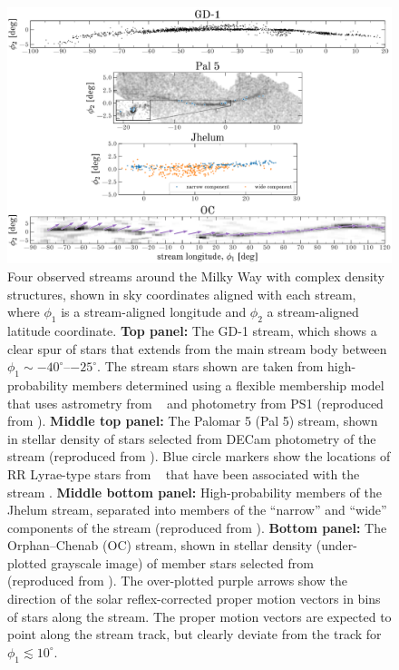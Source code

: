 \documentclass[final,5p,times,twocolumn,authoryear]{elsarticle}
\begin{document}
\begin{figure}[t!]
    \centering
    \includegraphics[width=\textwidth]{figures/stream-density-structure.pdf}
    \caption{
        Four observed streams around the Milky Way with complex density structures,
        shown in sky coordinates aligned with each stream, where $\phi_1$ is a
        stream-aligned longitude and $\phi_2$ a stream-aligned latitude coordinate.
        \textbf{Top panel:} The GD-1 stream, which shows a clear spur of stars that
        extends from the main stream body between $\phi_1 \sim -40^\circ$--$-25^\circ$.
        The stream stars shown are taken from high-probability members determined using
        a flexible membership model that uses astrometry from \gaia\  and
        photometry from PS1 (reproduced from \citealt{tavangar:2024}).
        \textbf{Middle top panel:} The Palomar 5 (Pal 5) stream, shown in stellar
        density of stars selected from DECam photometry of the stream (reproduced from
        \citealt{bonaca:2019}).
        Blue circle markers show the locations of RR Lyrae-type stars from \gaia\ 
        that have been associated with the stream \citep{price-whelan:2019}.
        \textbf{Middle bottom panel:} High-probability members of the Jhelum stream,
        separated into members of the ``narrow'' and ``wide'' components of the stream
        (reproduced from \citealt{awad:2024}).
        \textbf{Bottom panel:} The Orphan--Chenab (OC) stream, shown in stellar density
        (under-plotted grayscale image) of member stars selected from \gaia\ 
        (reproduced from \citealt{koposov:2023}).
        The over-plotted purple arrows show the direction of the solar reflex-corrected
        proper motion vectors in bins of stars along the stream.
        The proper motion vectors are expected to point along the stream track, but
        clearly deviate from the track for $\phi_1 \lesssim 10^\circ$.
        \label{fig:four-obs-streams}
    }
\end{figure}
\end{document}

